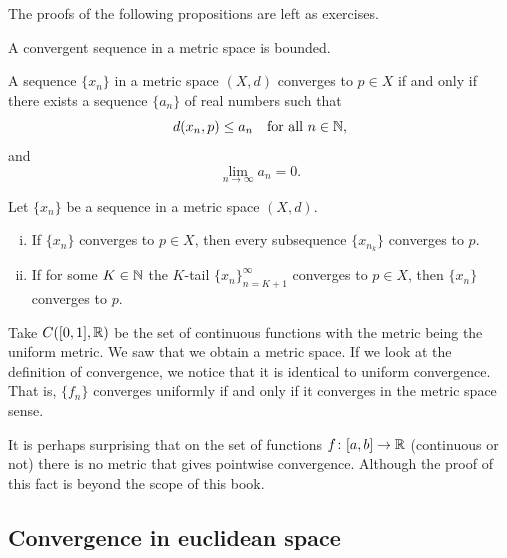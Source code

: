 The proofs of the following propositions are left as exercises.

\begin{prop} \label{prop:msconvbound}
A convergent sequence in a metric space is bounded.
\end{prop}

\begin{prop} \label{prop:msconvifa}
A sequence $\{ x_n \}$ in a metric space $(X,d)$ converges to $p \in X$
if and only
if there exists a sequence $\{ a_n \}$ of real numbers such that
\begin{equation*}
d(x_n,p) \leq a_n \quad \text{for all $n \in {\mathbb{N}}$},
\end{equation*}
and
\begin{equation*}
\lim_{n\to\infty} a_n = 0.
\end{equation*}
\end{prop}

\begin{prop} \label{prop:mssubseq}
Let $\{ x_n \}$ be a sequence in a metric space $(X,d)$.
\begin{enumerate}[(i)]
\item If $\{ x_n \}$ converges to $p \in X$, then every subsequence $\{ x_{n_k} \}$
converges to $p$.
\item If for some $K \in {\mathbb{N}}$ the $K$-tail $\{ x_n \}_{n=K+1}^\infty$
converges to $p \in X$, then
 $\{ x_n \}$ converges to $p$.
\end{enumerate}
\end{prop}

\begin{example}
Take $C([0,1],{\mathbb{R}})$ be the set of continuous functions with the metric being
the uniform metric.  We saw that we obtain a metric space.
If we look at the definition of convergence, we notice that it is identical
to uniform convergence.  That is, $\{ f_n \}$ converges uniformly if and only
if it converges in the metric space sense.
\end{example}

\begin{remark}
It is perhaps surprising that on the set of functions $f \colon [a,b] \to
{\mathbb{R}}$ (continuous or not)
there is no metric that gives pointwise convergence.  Although the proof of
this fact is beyond the scope of this book.
\end{remark}

\subsection{Convergence in euclidean space}

